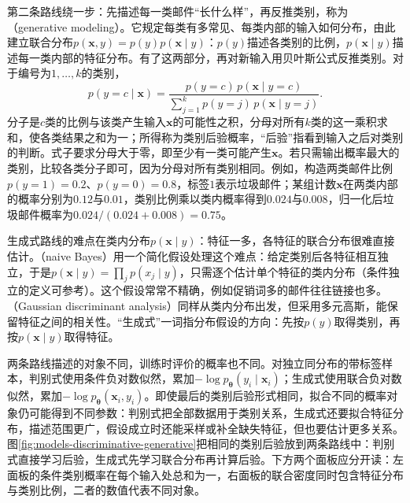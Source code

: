 第二条路线绕一步：先描述每一类邮件“长什么样”，再反推类别，称为（generative modeling）。它规定每类有多常见、每类内部的输入如何分布，由此建立联合分布$p(\bm{x},y)=p(y)p(\bm{x}\mid y)$：$p(y)$描述各类别的比例，$p(\bm{x}\mid y)$描述每一类内部的特征分布。有了这两部分，再对新输入用贝叶斯公式反推类别。对于编号为$1,\ldots,k$的类别，
\begin{equation}
  p(y=c\mid\bm{x})
  =\frac{p(y=c)\,p(\bm{x}\mid y=c)}
         {\sum_{j=1}^{k}p(y=j)\,p(\bm{x}\mid y=j)}.
  \label{eq:models-generative-classification}
\end{equation}
分子是$c$类的比例与该类产生输入$\bm{x}$的可能性之积，分母对所有$k$类的这一乘积求和，使各类结果之和为一；所得称为类别后验概率，“后验”指看到输入之后对类别的判断。式子要求分母大于零，即至少有一类可能产生$\bm{x}$。若只需输出概率最大的类别，比较各类分子即可，因为分母对所有类别相同。例如，构造两类邮件比例$p(y=1)=0.2$、$p(y=0)=0.8$，标签$1$表示垃圾邮件；某组计数$\bm{x}$在两类内部的概率分别为$0.12$与$0.01$，类别比例乘以类内概率得到$0.024$与$0.008$，归一化后垃圾邮件概率为$0.024/(0.024+0.008)=0.75$。

生成式路线的难点在类内分布$p(\bm{x}\mid y)$：特征一多，各特征的联合分布很难直接估计。（naive Bayes）用一个简化假设处理这个难点：给定类别后各特征相互独立，于是$p(\bm{x}\mid y)=\prod_{j}p(x_j\mid y)$，只需逐个估计单个特征的类内分布（条件独立的定义可参考）。这个假设常常不精确，例如促销词多的邮件往往链接也多。（Gaussian discriminant analysis）同样从类内分布出发，但采用多元高斯，能保留特征之间的相关性。“生成式”一词指分布假设的方向：先按$p(y)$取得类别，再按$p(\bm{x}\mid y)$取得特征。

两条路线描述的对象不同，训练时评价的概率也不同。对独立同分布的带标签样本，判别式使用条件负对数似然，累加$-\log p_{\bm{\theta}}(y_i\mid\bm{x}_i)$；生成式使用联合负对数似然，累加$-\log p_{\bm{\theta}}(\bm{x}_i,y_i)$。即使最后的类别后验形式相同，拟合不同的概率对象仍可能得到不同参数：判别式把全部数据用于类别关系，生成式还要拟合特征分布，描述范围更广，假设成立时还能采样或补全缺失特征，但也要估计更多关系。图\ref{fig:models-discriminative-generative}把相同的类别后验放到两条路线中：判别式直接学习后验，生成式先学习联合分布再计算后验。下方两个面板应分开读：左面板的条件类别概率在每个输入处总和为一，右面板的联合密度同时包含特征分布与类别比例，二者的数值代表不同对象。

